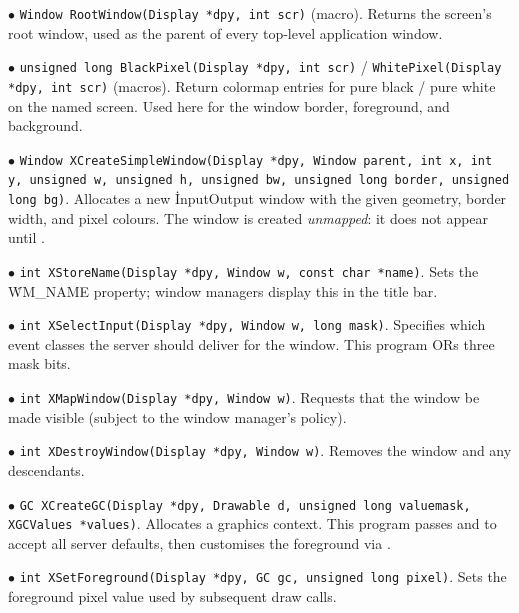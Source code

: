 \item{$\bullet$} {\tt Window RootWindow(Display *dpy, int scr)} (macro).
Returns the screen's root window, used as the parent of every
top-level application window.

\item{$\bullet$} {\tt unsigned long BlackPixel(Display *dpy, int scr)}
/ {\tt WhitePixel(Display *dpy, int scr)} (macros).
Return colormap entries for pure black / pure white on the named
screen.  Used here for the window border, foreground, and background.

\item{$\bullet$} {\tt Window XCreateSimpleWindow(Display *dpy,
Window parent, int x, int y, unsigned w, unsigned h, unsigned bw,
unsigned long border, unsigned long bg)}.
Allocates a new \.{InputOutput} window with the given geometry,
border width, and pixel colours.  The window is created
{\it unmapped}: it does not appear until .

\item{$\bullet$} {\tt int XStoreName(Display *dpy, Window w,
const char *name)}.
Sets the \.{WM\_NAME} property; window managers display this in the
title bar.

\item{$\bullet$} {\tt int XSelectInput(Display *dpy, Window w,
long mask)}.
Specifies which event classes the server should deliver for the
window.  This program ORs three mask bits.

\item{$\bullet$} {\tt int XMapWindow(Display *dpy, Window w)}.
Requests that the window be made visible (subject to the window
manager's policy).

\item{$\bullet$} {\tt int XDestroyWindow(Display *dpy, Window w)}.
Removes the window and any descendants.

\item{$\bullet$} {\tt GC XCreateGC(Display *dpy, Drawable d,
unsigned long valuemask, XGCValues *values)}.
Allocates a graphics context.  This program passes
 and  to accept all server
defaults,
then customises the foreground via .

\item{$\bullet$} {\tt int XSetForeground(Display *dpy, GC gc,
unsigned long pixel)}.
Sets the foreground pixel value used by subsequent draw calls.

